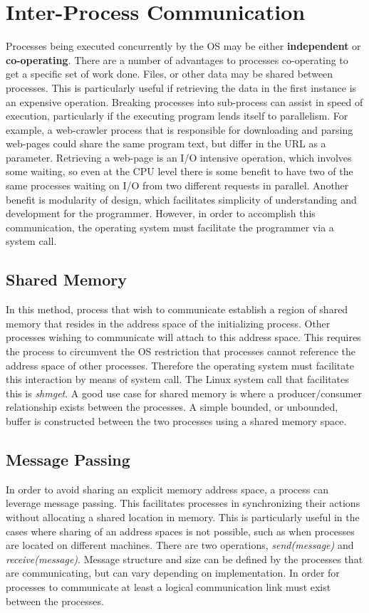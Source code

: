 \documentclass[10pt,a4paper]{article}
\begin{document}
\section{Inter-Process Communication}
Processes being executed concurrently by the OS may be either {\bf independent} or {\bf co-operating}. There are a number of advantages to processes co-operating to get a specific set of work done. Files, or other data may be shared between processes. This is particularly useful if retrieving the data in the first instance is an expensive operation. Breaking processes into sub-process can assist in speed of execution, particularly if the executing program lends itself to parallelism. For example, a web-crawler process that is responsible for downloading and parsing web-pages could share the same program text, but differ in the URL as a parameter. Retrieving a web-page is an I/O intensive operation, which involves some waiting, so even at the CPU level there is some benefit to have two of the same processes waiting on I/O from two different requests in parallel.  Another benefit is modularity of design, which facilitates simplicity of understanding and development for the programmer. However, in order to accomplish this communication, the operating system must facilitate the programmer via a system call. 
\subsection{Shared Memory}
In this method, process that wish to communicate establish a region of shared memory that resides in the address space of the initializing process. Other processes wishing to communicate will attach to this address space. This requires the process to circumvent the OS restriction that processes cannot reference the address space of other processes. Therefore the operating system must facilitate this interaction by means of system call. The Linux system call that facilitates this is {\it shmget}. A good use case for shared memory is where a producer/consumer relationship exists between the processes. A simple bounded, or unbounded, buffer is constructed between the two processes using a shared memory space. 
\subsection{Message Passing}
In order to avoid sharing an explicit memory address space, a process can leverage message passing. This facilitates processes in synchronizing their actions without allocating a shared location in memory. This is particularly useful in the cases where sharing of an address spaces is not possible, such as when processes are located on different machines. There are two operations, {\it send(message)} and {\it receive(message)}. Message structure and size can be defined by the processes that are communicating, but can vary depending on implementation. In order for processes to communicate at least a logical communication link must exist between the processes. 
\end{document}
